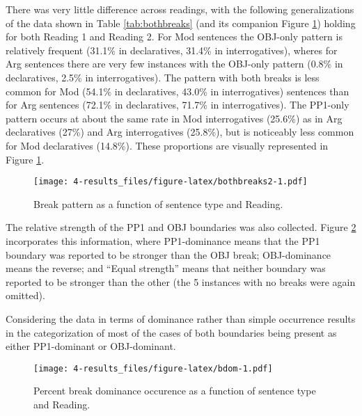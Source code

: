 \documentclass[11pt,oneside]{book}
\begin{document}
There was very little difference across readings, with the following generalizations of the data shown in Table \ref{tab:bothbreaks} (and its companion Figure \ref{fig:bothbreaks2}) holding for both Reading 1 and Reading 2. For Mod sentences the OBJ-only pattern is relatively frequent (31.1\% in declaratives, 31.4\% in interrogatives), wheres for Arg sentences there are very few instances with the OBJ-only pattern (0.8\% in declaratives, 2.5\% in interrogatives). The pattern with both breaks is less common for Mod (54.1\% in declaratives, 43.0\% in interrogatives) sentences than for Arg sentences (72.1\% in declaratives, 71.7\% in interrogatives). The PP1-only pattern occurs at about the same rate in Mod interrogatives (25.6\%) as in Arg declaratives (27\%) and Arg interrogatives (25.8\%), but is noticeably less common for Mod declaratives (14.8\%). These proportions are visually represented in Figure \ref{fig:bothbreaks2}.

\begin{figure}
\centering
\texttt{[image: 4-results\_files/figure-latex/bothbreaks2-1.pdf]}
\caption{\label{fig:bothbreaks2}Break pattern as a function of sentence type and Reading.}
\end{figure}

The relative strength of the PP1 and OBJ boundaries was also collected. Figure \ref{fig:bdom} incorporates this information, where PP1-dominance means that the PP1 boundary was reported to be stronger than the OBJ break; OBJ-dominance means the reverse; and ``Equal strength'' means that neither boundary was reported to be stronger than the other (the 5 instances with no breaks were again omitted).

Considering the data in terms of dominance rather than simple occurrence results in the categorization of most of the cases of both boundaries being present as either PP1-dominant or OBJ-dominant.

\begin{figure}
\centering
\texttt{[image: 4-results\_files/figure-latex/bdom-1.pdf]}
\caption{\label{fig:bdom}Percent break dominance occurence as a function of sentence type and Reading.}
\end{figure}
\end{document}
